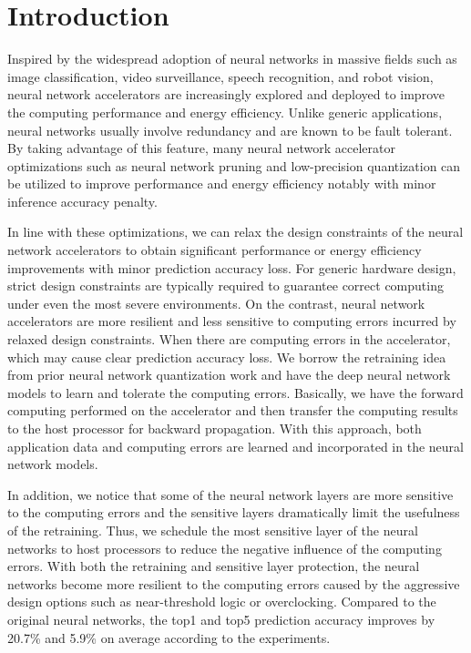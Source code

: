 \section{Introduction} \label{sec:intro}
Inspired by the widespread adoption of neural networks in massive fields such as image classification, 
video surveillance, speech recognition, and robot vision, neural network accelerators 
\cite{Zhang2015_9,deepburing_12,DiCecco_4} 
are increasingly explored and deployed to improve the computing performance and energy efficiency.
Unlike generic applications, neural networks usually involve redundancy and are known to be 
fault tolerant\cite{Reagen2016}. By taking advantage of this feature, many neural network accelerator optimizations 
such as neural network pruning and low-precision quantization can be utilized to improve 
performance and energy efficiency notably with minor inference accuracy penalty\cite{Han2016DeepCC}. 

In line with these optimizations, we can relax the design constraints of 
the neural network accelerators to obtain significant performance or energy efficiency 
improvements with minor prediction accuracy loss. 
For generic hardware design, strict design constraints are typically required to 
guarantee correct computing under even the most severe environments. On the contrast, 
neural network accelerators are more resilient and less sensitive to computing 
errors incurred by relaxed design constraints. When there are computing errors in the accelerator, 
which may cause clear prediction accuracy loss. We borrow the retraining 
idea from prior neural network quantization work \cite{Hwang2014_17,Matthieu2014_8} 
and have the deep neural network models to learn and tolerate the computing errors.  
Basically, we have the forward computing performed on the accelerator and 
then transfer the computing results to the host processor for 
backward propagation. With this approach, both application data and computing 
errors are learned and incorporated in the neural network models.  

In addition, we notice that some of the neural network layers are more sensitive to the 
computing errors and the sensitive layers dramatically limit the usefulness of the retraining. 
Thus, we schedule the most sensitive layer of the neural networks to host processors to reduce the negative influence 
of the computing errors. With both the retraining and sensitive layer protection, 
the neural networks become more resilient to the computing errors caused by 
the aggressive design options such as near-threshold logic or overclocking.
Compared to the original neural networks, the top1 and top5 prediction accuracy
improves by 20.7\% and 5.9\% on average according to the experiments. 

